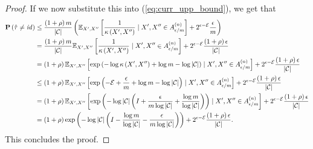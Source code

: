 \begin{proof}
If we now substitute this into (\ref{eq:curr_upp_bound}), we get that
%
\begin{align}
\mathbf{P}\left(\hat{\tau} \neq \mathit{id}\right) &\leq \frac{\left(1 + \rho\right)m}{\left|\mathcal{C}\right|}\left(\mathbb{E}_{X', X''}\left[\frac{1}{\kappa\left(X', X''\right)} \mid X', X'' \in A^{(n)}_{\epsilon/m}\right] + 2^{\epsilon - \mathcal{E}}\frac{\epsilon}{m}\right)\\
&= \frac{\left(1 + \rho\right)m}{\left|\mathcal{C}\right|}\mathbb{E}_{X', X''}\left[\frac{1}{\kappa\left(X', X''\right)} \mid X', X'' \in A^{(n)}_{\epsilon/m}\right] + 2^{\epsilon - \mathcal{E}}\frac{\left(1 + \rho\right)\epsilon}{\left|\mathcal{C}\right|}\\
&= \left(1 + \rho\right)\mathbb{E}_{X', X''}\left[\exp\left(- \log\kappa\left(X', X''\right) + \log m - \log \left|\mathcal{C}\right|\right) \mid X', X'' \in A^{(n)}_{\epsilon/m}\right] + 2^{\epsilon - \mathcal{E}}\frac{\left(1 + \rho\right)\epsilon}{\left|\mathcal{C}\right|}\\
&\leq \left(1 + \rho\right)\mathbb{E}_{X', X''}\left[\exp\left(- \mathcal{E} + \frac{\epsilon}{m} + \log m - \log \left|\mathcal{C}\right|\right) \mid X', X'' \in A^{(n)}_{\epsilon/m}\right] + 2^{\epsilon - \mathcal{E}}\frac{\left(1 + \rho\right)\epsilon}{\left|\mathcal{C}\right|}\\
&= \left(1 + \rho\right)\mathbb{E}_{X', X''}\left[\exp\left(-\log\left|\mathcal{C}\right|\left(I + \frac{\epsilon}{m\log \left|\mathcal{C}\right|} + \frac{\log m}{\log \left|\mathcal{C}\right|}\right)\right) \mid X', X'' \in A^{(n)}_{\epsilon/m}\right] + 2^{\epsilon - \mathcal{E}}\frac{\left(1 + \rho\right)\epsilon}{\left|\mathcal{C}\right|}\\
&= \left(1 + \rho\right)\exp\left(-\log\left|\mathcal{C}\right|\left(I - \frac{\log m}{\log \left|\mathcal{C}\right|} -  \frac{\epsilon}{m\log \left|\mathcal{C}\right|}\right)\right) + 2^{\epsilon - \mathcal{E}}\frac{\left(1 + \rho\right)\epsilon}{\left|\mathcal{C}\right|}.
\end{align}
This concludes the proof.
%
%

\end{proof}
